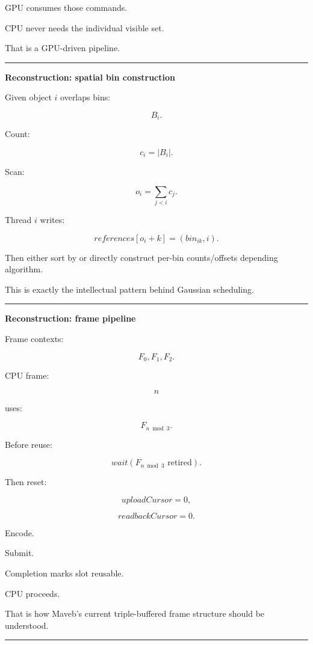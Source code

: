 GPU consumes those commands.

CPU never needs the individual visible set.

That is a GPU-driven pipeline.

\begin{center}\rule{0.5\linewidth}{0.5pt}\end{center}

\textbf{Reconstruction: spatial bin construction}

Given object \(i\) overlaps bins:

\[
B_i.
\]

Count:

\[
c_i=|B_i|.
\]

Scan:

\[
o_i=
\sum_{j<i}c_j.
\]

Thread \(i\) writes:

\[
references[
o_i+k
]
=
(
bin_{ik},
i
).
\]

Then either sort by  or directly construct per-bin counts/offsets depending algorithm.

This is exactly the intellectual pattern behind Gaussian scheduling.

\begin{center}\rule{0.5\linewidth}{0.5pt}\end{center}

\textbf{Reconstruction: frame pipeline}

Frame contexts:

\[
F_0,F_1,F_2.
\]

CPU frame:

\[
n
\]

uses:

\[
F_{n\bmod3}.
\]

Before reuse:

\[
wait(
F_{n\bmod3}
\text{ retired}
).
\]

Then reset:

\[
uploadCursor=0,
\]

\[
readbackCursor=0.
\]

Encode.

Submit.

Completion marks slot reusable.

CPU proceeds.

That is how Maveb's current triple-buffered frame structure should be understood.

\begin{center}\rule{0.5\linewidth}{0.5pt}\end{center}

